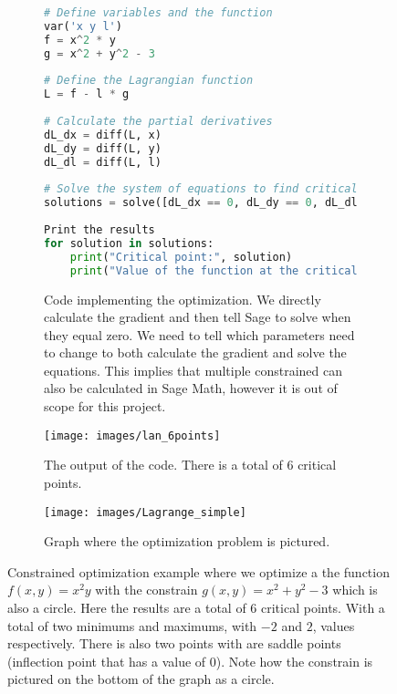 \documentclass[]{article}
\theoremstyle{definition}
\newtheorem{exmp}{Example}[section]
\begin{document}
\begin{figure}
	\centering
	\begin{subfigure}{\textwidth}
			\caption{Code implementing the optimization. We directly calculate the gradient and then tell Sage to solve when they equal zero. We need to tell which parameters need to change to both calculate the gradient and solve the equations. This implies that multiple constrained can also be calculated in Sage Math, however it is out of scope for this project.}
			\begin{lstlisting}[language=python]
# Define variables and the function
var('x y l')
f = x^2 * y
g = x^2 + y^2 - 3
				
# Define the Lagrangian function
L = f - l * g 
				
# Calculate the partial derivatives
dL_dx = diff(L, x)
dL_dy = diff(L, y)
dL_dl = diff(L, l)
				
# Solve the system of equations to find critical points
solutions = solve([dL_dx == 0, dL_dy == 0, dL_dl == 0], x, y, l, solution_dict=True)
				
Print the results
for solution in solutions:
	print("Critical point:", solution)
	print("Value of the function at the critical point:", f.subs(solution))			
			\end{lstlisting}
	\end{subfigure}
	\hfill
	\begin{subfigure}{.45\textwidth}
		\caption{The output of the code. There is a total of 6 critical points.}
		\texttt{[image: images/lan\_6points]}
	\end{subfigure}
	\hfill
	\begin{subfigure}{.45\textwidth}
		\caption{Graph where the optimization problem is pictured.}
		\texttt{[image: images/Lagrange\_simple]}
	\end{subfigure}
	\caption{Constrained optimization example where we optimize a the function $f(x, y) = x^2y$ with the constrain $g(x, y) = x^2 + y^2 - 3$ which is also a circle. Here the results are a total of 6 critical points. With a total of two minimums and maximums, with $-2$ and $2$, values respectively. There is also two points with are saddle points (inflection point that has a value of $0$). Note how the constrain is pictured on the bottom of the graph as a circle.}
	\label{fig:example_big}
\end{figure}
\end{document}

